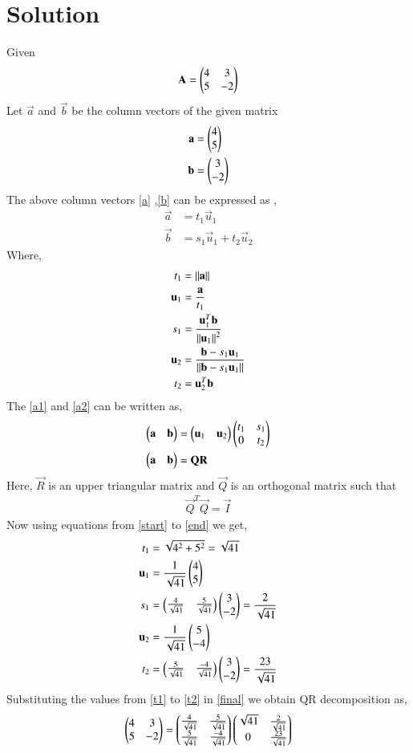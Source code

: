 \documentclass[journal,12pt,twocolumn]{IEEEtran}
\begin{document}
\section{Solution}
Given 
\begin{align}
    \mathbf{A}=\begin{pmatrix}4&3\\5&-2\end{pmatrix}
\end{align}
Let $\vec{a}$ and $\vec{b}$ be the column vectors of the given matrix
\begin{align}
\mathbf{a}&=\begin{pmatrix}4\\5\end{pmatrix}\label{a}\\
\mathbf{b}&=\begin{pmatrix}3\\-2\end{pmatrix}\label{b}
\end{align}
The above column vectors \eqref{a} ,\eqref{b} can be expressed as ,
\begin{align}
\vec{a}&=t_1\vec{u}_1\label{a1}\\
\vec{b}&=s_1\vec{u}_1+t_2\vec{u}_2\label{a2}
\end{align}
Where, 
\begin{align}
t_1 &= \left\lVert\mathbf{a}\right\rVert\label{start}\\
\mathbf{u}_1 &= \frac{\mathbf{a}}{t_1}\\
s_1 &= \frac{\mathbf{u}_1^T\mathbf{b}}{\left\lVert\mathbf{u}_1\right\rVert^2}\\
\mathbf{u}_2 &= \frac{\mathbf{b} - s_1 \mathbf{u}_1}{\left\lVert\mathbf{b} - s_1 \mathbf{u}_1\right\rVert}\\
t_2 &= {\mathbf{u}_2^T\mathbf{b}}\label{end}
\end{align}
The \eqref{a1} and \eqref{a2} can be written as, 
\begin{align}
\begin{pmatrix}\mathbf{a} & \mathbf{b}\end{pmatrix} &= \begin{pmatrix}\mathbf{u}_1 & \mathbf{u}_2\end{pmatrix}\begin{pmatrix}t_1 & s_1 \\ 0 & t_2\end{pmatrix}\\
\begin{pmatrix}\mathbf{a} & \mathbf{b}\end{pmatrix} &= \mathbf{Q}\mathbf{R}\label{final}
\end{align}
Here, $\vec{R}$ is an upper triangular matrix and $\vec{Q}$ is an orthogonal matrix such that
\begin{align}
\vec{Q}^T\vec{Q}=\vec{I}
\end{align}
Now using equations from \eqref{start} to \eqref{end} we get, 
\begin{align}
t_1 &= \sqrt{4^2+5^2} = \sqrt{41}\label{t1}\\ 
\mathbf{u}_1 &= \frac{1}{\sqrt{41}}\begin{pmatrix}4\\5\end{pmatrix}\\
s_1 &= \begin{pmatrix}\frac{4}{\sqrt{41}}&\frac{5}{\sqrt{41}}\end{pmatrix}\begin{pmatrix}3\\-2\end{pmatrix} = \frac{2}{\sqrt{41}}\\ 
\mathbf{u}_2 &= \frac{1}{\sqrt{41}}\begin{pmatrix}5\\-4\end{pmatrix}\\
t_2 &= \begin{pmatrix}\frac{5}{\sqrt{41}}&\frac{-4}{\sqrt{41}}\end{pmatrix}\begin{pmatrix}3\\-2\end{pmatrix} = \frac{23}{\sqrt{41}}\label{t2} 
\end{align}
Substituting the values from \eqref{t1} to \eqref{t2} in \eqref{final} we obtain QR decomposition as,
\begin{align}
\begin{pmatrix}4&3\\5&-2\end{pmatrix}=\begin{pmatrix}\frac{4}{\sqrt{41}}&\frac{5}{\sqrt{41}}\\\frac{5}{\sqrt{41}}&\frac{-4}{\sqrt{41}}\end{pmatrix}\begin{pmatrix}\sqrt{41}&\frac{2}{\sqrt{41}}\\0&\frac{23}{\sqrt{41}}\end{pmatrix}
\end{align}
\end{document}
